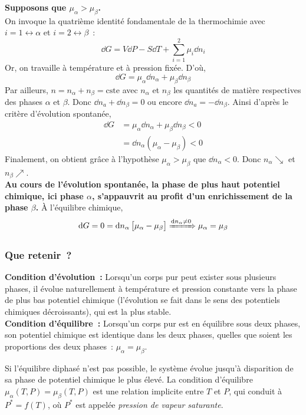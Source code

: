 \documentclass{article}
\newcommand{\cste}{\text{cste}}
\begin{document}
\begin{tableau}
    \textbf{Supposons que $\mu_\alpha > \mu_\beta$.}\\
        On invoque la quatrième identité fondamentale de la thermochimie avec $i=1\leftrightarrow \alpha$ et $i=2\leftrightarrow \beta$~:
        $$\dd{G} = V\dd{P} - S\dd{T} + \sum_{i=1}^2 \mu_i \dd{n_i}$$
        Or, on travaille à température et à pression fixée. D'où,
        $$\dd{G} = \mu_\alpha \dd{n_\alpha} + \mu_\beta \dd{n_\beta}$$
        Par ailleurs, $n = n_\alpha + n_\beta = \cste$ avec $n_\alpha$ et $n_\beta$ les quantités de matière respectives des phases $\alpha$ et $\beta$. Donc $\dd{n_a} + \dd{n_\beta} = 0$ ou encore $\dd{n_a} =- \dd{n_\beta}$. Ainsi d'après le critère d'évolution spontanée,
    \begin{align*}
        \dd{G} &= \mu_\alpha \dd{n_\alpha} + \mu_\beta \dd{n_\beta} <0\\
        & = \dd{n_\alpha} (\mu_\alpha-\mu_\beta) <0
    \end{align*}
    Finalement, on obtient grâce à l'hypothèse $\mu_\alpha > \mu_\beta$ que $\dd{n_\alpha}<0$. Donc $n_\alpha \searrow$ et $n_\beta \nearrow$.\\
    
    \textbf{Au cours de l'évolution spontanée, la phase de plus haut potentiel chimique, ici phase $\alpha$, s'appauvrit au profit d'un enrichissement de la phase $\beta$.}
    \tcbline
    À l'équilibre chimique,
    $$\dd{G} = 0 = \dd{n_\alpha}\big[\mu_\alpha - \mu_\beta\big] \xRightarrow[]{\dd{n_\alpha}\neq 0} \mu_\alpha = \mu_\beta$$
\end{tableau}
\subsubsection{Que retenir~?}
\begin{important}
    \textbf{Condition d'évolution~:} Lorsqu'un corps pur peut exister sous plusieurs phases, il évolue naturellement à température et pression constante vers la phase de plus bas potentiel chimique (l'évolution se fait dans le sens des potentiels chimiques décroissants), qui est la plus stable.\\
    \textbf{Condition d'équilibre~:} Lorsqu'un corps pur est en équilibre sous deux phases, son potentiel chimique est identique dans les deux phases, quelles que soient les proportions des deux phases~: $\mu_\alpha = \mu_\beta$. 
\end{important}

\begin{remarque}[Remarque]
    Si l'équilibre diphasé n'est pas possible, le système évolue jusqu'à disparition de sa phase  de potentiel chimique le plus élevé. La condition d'équilibre $\mu_\alpha(T,P) = \mu_\beta(T,P)$ est une relation implicite entre $T$ et $P$, qui conduit à $P^* = f(T)$, où $P^*$ est appelée \textit{pression de vapeur saturante}.
\end{remarque}
\end{document}
